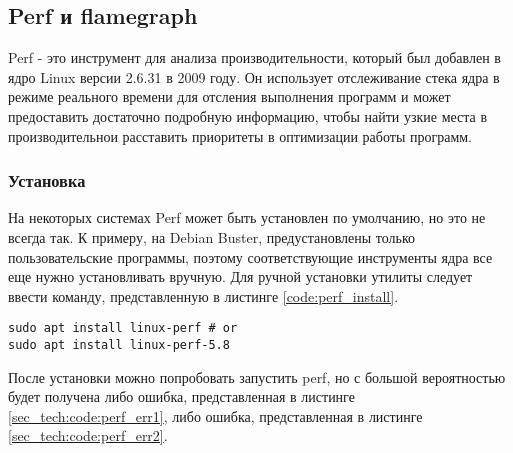 \subsection{Perf и flamegraph}

Perf - это инструмент для анализа производительности, который был добавлен в ядро Linux версии 2.6.31 в 2009 году.
Он использует отслеживание стека ядра в режиме реального времени для отсления выполнения программ и может предоставить 
достаточно подробную информацию, чтобы найти узкие места в производительнои расставить приоритеты в оптимизации работы программ.

\subsubsection{Установка} 

На некоторых системах Perf может быть установлен по умолчанию, но это не всегда так.
К примеру, на Debian Buster, предустановлены только пользовательские программы, поэтому соответствующие инструменты ядра все еще нужно установливать вручную.
Для ручной установки утилиты следует ввести команду, представленную в листинге \ref{code:perf_install}.

\begin{lstlisting}[style=CodeListing, caption={Установка утилиты perf в ОС Linux}, label=code:perf_install]
sudo apt install linux-perf # or
sudo apt install linux-perf-5.8
\end{lstlisting}

После установки можно попробовать запустить perf, но с большой вероятностью будет получена либо ошибка, представленная в листинге \ref{sec_tech:code:perf_err1}, либо ошибка, представленная в листинге \ref{sec_tech:code:perf_err2}.

